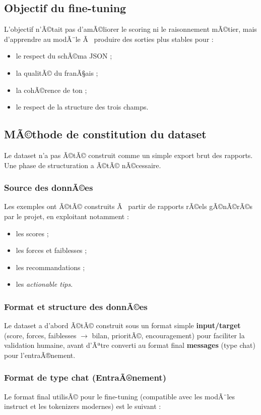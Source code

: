 ﻿\documentclass[12pt,a4paper]{article}
\begin{document}
\subsection{Objectif du fine-tuning}
L'objectif n'Ã©tait pas d'amÃ©liorer le scoring ni le raisonnement mÃ©tier, mais d'apprendre au modÃ¨le Ã  produire des sorties plus stables pour :
\begin{itemize}
    \item le respect du schÃ©ma JSON ;
    \item la qualitÃ© du franÃ§ais ;
    \item la cohÃ©rence de ton ;
    \item le respect de la structure des trois champs.
\end{itemize}

\subsection{MÃ©thode de constitution du dataset}
Le dataset n'a pas Ã©tÃ© construit comme un simple export brut des rapports. Une phase de structuration a Ã©tÃ© nÃ©cessaire.

\subsubsection{Source des donnÃ©es}
Les exemples ont Ã©tÃ© construits Ã  partir de rapports rÃ©els gÃ©nÃ©rÃ©s par le projet, en exploitant notamment :
\begin{itemize}
    \item les scores ;
    \item les forces et faiblesses ;
    \item les recommandations ;
    \item les \textit{actionable tips}.
\end{itemize}

\subsubsection{Format et structure des donnÃ©es}
Le dataset a d'abord Ã©tÃ© construit sous un format simple \textbf{input/target} (score, forces, faiblesses $\rightarrow$ bilan, prioritÃ©, encouragement) pour faciliter la validation humaine, avant d'Ãªtre converti au format final \textbf{messages} (type chat) pour l'entraÃ®nement.

\subsubsection{Format de type chat (EntraÃ®nement)}
Le format final utilisÃ© pour le fine-tuning (compatible avec les modÃ¨les instruct et les tokenizers modernes) est le suivant :
\end{document}
